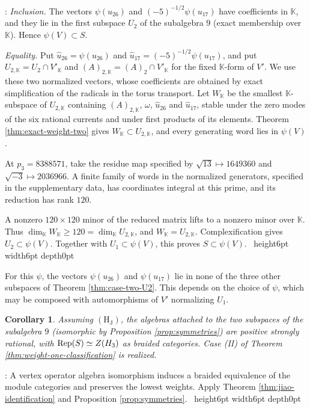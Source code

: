 \documentclass[leqno]{article}
\newcommand{\K}{\ensuremath{\mathbb{K}}}
\let\cal\relax
\newcommand{\cal}{\mathcal}
\renewcommand{\geq}{\ensuremath{\geqslant}}
\newcommand{\qed}{\hfill \vrule height6pt  width6pt depth0pt}
\DeclareMathOperator{\Rep}{Rep}
\newtheorem{cor}[thm]{Corollary}
\newenvironment{proof}[1][]{\noindent {\it Proof #1} : }{\hbox{~}\qed
\smallskip
}
\numberwithin{equation}{section}
\begin{document}
\begin{proof}
\emph{Inclusion.} The vectors $\psi(u_{26})$ and $(-5)^{-1/2}\psi(u_{17})$ have coefficients in $\K$, and they lie in the first subspace $U_2$ of the subalgebra $9$ (exact membership over $\K$). Hence $\psi(V) \subset S$.

\emph{Equality.} Put $\widehat u_{26} = \psi(u_{26})$ and $\widehat u_{17} = (-5)^{-1/2}\psi(u_{17})$, and put $U_{2,\K} = U_2 \cap V'_\K$ and $(A)_{2,\K} = (A)_2 \cap V'_\K$ for the fixed $\K$-form of $V'$. We use these two normalized vectors, whose coefficients are obtained by exact simplification of the radicals in the torus transport. Let $W_\K$ be the smallest $\K$-subspace of $U_{2,\K}$ containing $(A)_{2,\K}$, $\omega$, $\widehat u_{26}$ and $\widehat u_{17}$, stable under the zero modes of the six rational currents and under first products of its elements. Theorem \ref{thm:exact-weight-two} gives $W_\K \subset U_{2,\K}$, and every generating word lies in $\psi(V)$.

At $p_3 = 8388571$, take the residue map specified by $\sqrt{13} \mapsto 1649360$ and $\sqrt{-3} \mapsto 2036966$. A finite family of words in the normalized generators, specified in the supplementary data, has coordinates integral at this prime, and its reduction has rank $120$.

A nonzero $120 \times 120$ minor of the reduced matrix lifts to a nonzero minor over $\K$. Thus $\dim_\K W_\K \geq 120 = \dim_\K U_{2,\K}$, and $W_\K = U_{2,\K}$. Complexification gives $U_2 \subset \psi(V)$. Together with $U_1 \subset \psi(V)$, this proves $S \subset \psi(V)$.
\end{proof}

For this $\psi$, the vectors $\psi(u_{26})$ and $\psi(u_{17})$ lie in none of the three other subspaces of Theorem \ref{thm:case-two-U2}. This depends on the choice of $\psi$, which may be composed with automorphisms of $V'$ normalizing $U_1$.

\begin{cor}
\label{cor:case-two-realized}
Assuming $\mathrm{(H_J)}$, the algebras attached to the two subspaces of the subalgebra $9$ (isomorphic by Proposition \ref{prop:symmetries}) are positive strongly rational, with $\Rep(S) \simeq Z(\cal H_3)$ as braided categories. Case (II) of Theorem \ref{thm:weight-one-classification} is realized.
\end{cor}

\begin{proof}
A vertex operator algebra isomorphism induces a braided equivalence of the module categories and preserves the lowest weights. Apply Theorem \ref{thm:jiao-identification} and Proposition \ref{prop:symmetries}.
\end{proof}
\end{document}

